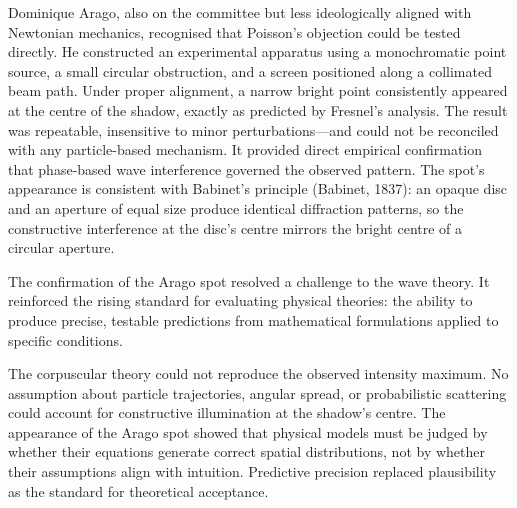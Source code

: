 Dominique Arago, also on the committee but less ideologically aligned with Newtonian mechanics, recognised that Poisson's objection could be tested directly. He constructed an experimental apparatus using a monochromatic point source, a small circular obstruction, and a screen positioned along a collimated beam path. Under proper alignment, a narrow bright point consistently appeared at the centre of the shadow, exactly as predicted by Fresnel's analysis. The result was repeatable, insensitive to minor perturbations—and could not be reconciled with any particle-based mechanism. It provided direct empirical confirmation that phase-based wave interference governed the observed pattern. The spot's appearance is consistent with Babinet's principle (Babinet, 1837): an opaque disc and an aperture of equal size produce identical diffraction patterns, so the constructive interference at the disc's centre mirrors the bright centre of a circular aperture.

The confirmation of the Arago spot resolved a challenge to the wave theory. It reinforced the rising standard for evaluating physical theories: the ability to produce precise, testable predictions from mathematical formulations applied to specific conditions.

The corpuscular theory could not reproduce the observed intensity maximum. No assumption about particle trajectories, angular spread, or probabilistic scattering could account for constructive illumination at the shadow's centre. The appearance of the Arago spot showed that physical models must be judged by whether their equations generate correct spatial distributions, not by whether their assumptions align with intuition. Predictive precision replaced plausibility as the standard for theoretical acceptance.

